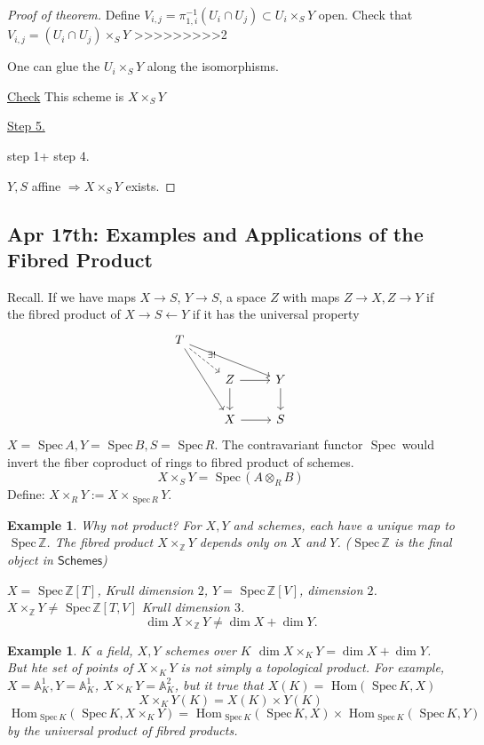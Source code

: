 \documentclass[11pt]{article}
\newtheorem{ex}[thm]{Example}
\renewcommand{\hom}{\text{ Hom}}
\newcommand{\spec}{\text{ Spec}\,}
\newcommand{\affn}{\mathbb A}
\newcommand{\intg}{\mathbb Z}
\newcommand{\Lrta}{\Longrightarrow}
\newcommand{\lrta}{\longrightarrow}
\begin{document}
\begin{proof}[Proof of theorem]
Define $V_{i,j}=\pi_{1,i}^{-1}(U_i\cap U_j)\subset U_i\times_S Y$ open. Check that $V_{i,j}=(U_i\cap U_j)\times_S Y$
>>>>>>>>>2

One can glue  the $U_i\times_S Y$ along the isomorphisms. 

\underline{Check} This scheme is $X\times_S Y$

\underline{Step 5.}

step 1+ step 4.

$Y,S$ affine $\Lrta X\times_S Y$ exists.
\end{proof}

\subsection{Apr 17th: Examples and Applications of the Fibred Product}
Recall.
If we have maps
 $X\lrta S$, $Y\lrta S$, a space $Z$ with maps $Z\lrta X, Z\lrta Y$ if the fibred product of $X\lrta S\longleftarrow Y$ if it has the universal property
 $$
\begin{tikzcd}
T \arrow[rdd] \arrow[rrd] \arrow[rd, "\exists!", dashed] &  &  \\
 & Z \arrow[d] \arrow[r] & Y \arrow[d] \\
 & X \arrow[r] & S
\end{tikzcd}
 $$
 $X=\spec A, Y=\spec B, S=\spec R$. The contravariant functor $\spec$ would invert the fiber coproduct of rings to fibred product of schemes.
 $$
X\times_S Y=\spec( A\otimes_R B)
 $$
 Define: $X\times_R Y:=X\times_{\spec R} Y$.

\begin{ex}
Why not product?
For $X,Y$ and schemes, each have a unique map to $\spec \intg$. The fibred product $X\times_\intg Y$ depends only on $X$ and $Y$. ($\spec \intg$ is the final object in $\mathsf{Schemes}$)

$X=\spec \intg[T]$, Krull dimension $2$, $Y=\spec \intg[V]$, dimension $2$. $X\times_\intg Y\neq\spec \intg[T,V]$ Krull dimension $3$.
$$
\dim X\times_\intg Y\neq \dim X+\dim Y.
$$
\end{ex}

\begin{ex}
$K$ a field, $X, Y$ schemes over $K$ $\dim X\times_K Y=\dim X+\dim Y$. But hte set of points of $X\times_K Y$ is not simply a topological product. For example, $X=\affn^1_K, Y=\affn^1_K$, $X\times_K Y=\affn^2_K$, but it true that $X(K)=\hom(\spec K, X)$
$$
X\times_K Y(K)=X(K)\times Y(K)
$$
$$
\hom_{\spec K}(\spec K, X\times_K Y)=\hom_{\spec K}(\spec K, X)\times \hom_{\spec K}(\spec K, Y)
$$
by the universal product of fibred products.
\end{ex}
\end{document}
